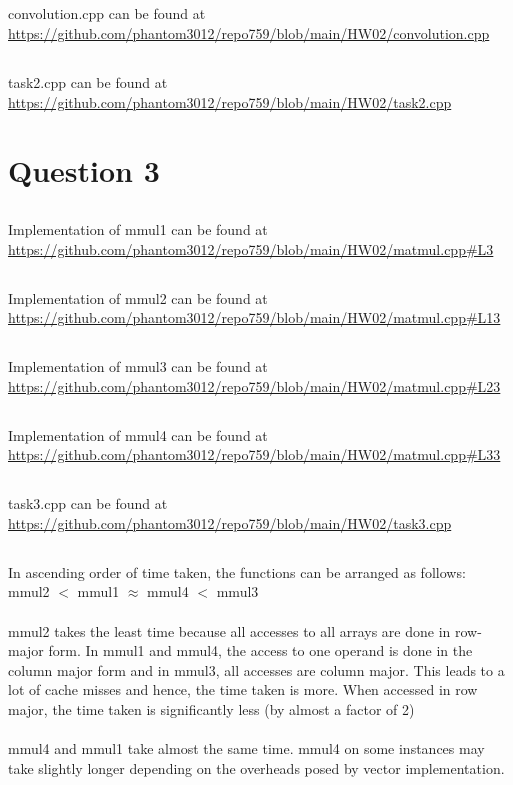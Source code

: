 \documentclass[12pt]{article}
\begin{document}
\subsection{}
convolution.cpp can be found at \url{https://github.com/phantom3012/repo759/blob/main/HW02/convolution.cpp}
\subsection{}
task2.cpp can be found at \url{https://github.com/phantom3012/repo759/blob/main/HW02/task2.cpp}

\section{Question 3}
\subsection{}
Implementation of mmul1 can be found at \url{https://github.com/phantom3012/repo759/blob/main/HW02/matmul.cpp#L3}
\subsection{}
Implementation of mmul2 can be found at \url{https://github.com/phantom3012/repo759/blob/main/HW02/matmul.cpp#L13}
\subsection{}
Implementation of mmul3 can be found at \url{https://github.com/phantom3012/repo759/blob/main/HW02/matmul.cpp#L23}
\subsection{}
Implementation of mmul4 can be found at \url{https://github.com/phantom3012/repo759/blob/main/HW02/matmul.cpp#L33}
\subsection{}
task3.cpp can be found at \url{https://github.com/phantom3012/repo759/blob/main/HW02/task3.cpp}
\subsection{}
In ascending order of time taken, the functions can be arranged as follows: mmul2 $<$ mmul1 $\approx$ mmul4 $<$ mmul3\\ \\
mmul2 takes the least time because all accesses to all arrays are done in row-major form. In mmul1 and mmul4, the access to one operand is done in the column major form and in mmul3, all accesses are column major. This leads to a lot of cache misses and hence, the time taken is more. When accessed in row major, the time taken is significantly less (by almost a factor of 2) \\ \\
mmul4 and mmul1 take almost the same time. mmul4 on some instances may take slightly longer depending on the overheads posed by vector implementation.
\end{document}
